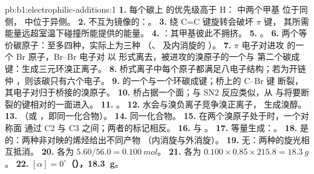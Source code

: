 \begin{solution}{pb:b1:electrophilic-additions:1}
\textbf{1.} 每个碳上  的优先级高于 H： 中两个甲基
位于同侧， 中位于异侧。
\textbf{2.} 不互为镜像的：。
\textbf{3.} 绕 C=C 键旋转会破坏 $\pi$ 键，
其所需能量远超室温下碰撞所能提供的能量。
\textbf{4.} ：其甲基彼此不拥挤。
\textbf{5.} 。
\textbf{6.} 两个等价碳原子：至多四种，实际上为三种
（、 及内消旋的 ）。
\textbf{7.} $\pi$ 电子对进攻  的一个 Br 原子，Br--Br 电子对
以  形式离去，被进攻的溴原子的一个与
第二个碳成键：生成三元环溴正离子。
\textbf{8.} 桥式离子中每个原子都满足八电子结构；若为开链仲
，则该碳只有六个电子。
\textbf{9.}  的一个与一个环碳成键；桥上的 C--Br 键
断裂，其电子对归于桥接的溴原子。
\textbf{10.} 桥占据一个面；与 SN2 反应类似，从
与将要断裂的键相对的一面进入。
\textbf{11.} 。
\textbf{12.} 水会与溴负离子竞争溴正离子，
生成溴醇。
\textbf{13.} （或 ，即同一化合物）。
\textbf{14.} 同一化合物。
\textbf{15.} 在两个溴原子处于时，一个对称面
通过 C2 与 C3 之间；两者的标记相反。
\textbf{16.}  与 。
\textbf{17.} 等量生成：。
\textbf{18.} 是的：两种非对映的烯烃给出不同产物
（内消旋与外消旋）。
\textbf{19.} 无：两种的旋光相互抵消。
\textbf{20.} 各为 $5.60/56.0 = \qty{0.100}{mol}$。
\textbf{21.} 各为 $0.100 \times 0.85 \times 215.8 = \qty{18.3}{g}$。
\textbf{22.} \textbf{$[\alpha] = 0^\circ$（），\qty{18.3}{g}}。
\end{solution}
